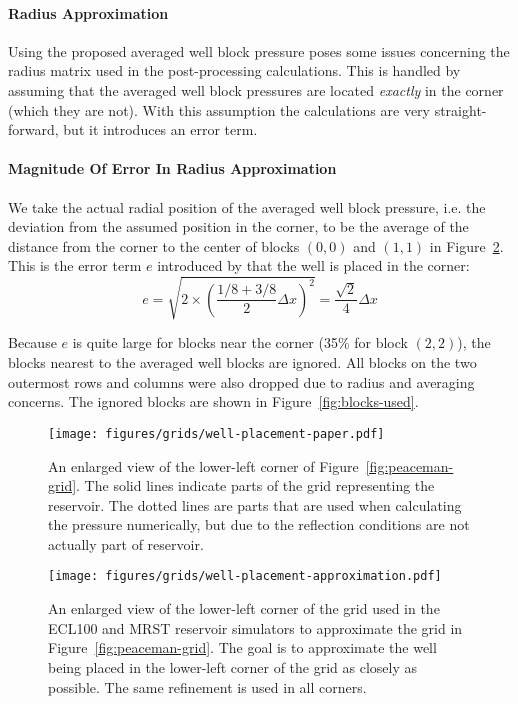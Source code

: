 \paragraph{Radius Approximation} %
\label{par:radius_approximation}
Using the proposed averaged well block pressure poses some issues concerning the radius matrix used in the post-processing calculations. This is handled by assuming that the averaged well block pressures are located \emph{exactly} in the corner (which they are not). With this assumption the calculations are very straight-forward, but it introduces an error term. 

\paragraph{Magnitude Of Error In Radius Approximation} %
\label{par:error_in_radius_approximation}
We take the actual radial position of the averaged well block pressure, i.e. the deviation from the assumed position in the corner, to be the average of the distance from the corner to the center of blocks $(0,0)$ and $(1,1)$ in Figure~\ref{fig:well-placement-approximation}. This is the error term $e$ introduced by that the well is placed in the corner:
\begin{equation}
    e = \sqrt{2\times \left( \frac{1/8+3/8}{2}\Delta x \right)^2} = \frac{\sqrt{2}}{4}\Delta x
\end{equation}

Because $e$ is quite large for blocks near the corner (35\% for block $(2,2)$), the  blocks nearest to the averaged well blocks are ignored. All blocks on the two outermost rows and columns were also dropped due to radius and averaging concerns. The ignored blocks are shown in Figure~\ref{fig:blocks-used}.

\begin{figure}[htbp]
    \centering
    \texttt{[image: figures/grids/well-placement-paper.pdf]}
    \caption{An enlarged view of the lower-left corner of Figure~\ref{fig:peaceman-grid}. The solid lines indicate parts of the grid representing the reservoir. The dotted lines are parts that are used when calculating the pressure numerically, but due to the reflection conditions are not actually part of reservoir.}
    \label{fig:well-placement-paper}
\end{figure}

\begin{figure}[htbp]
    \centering
    \texttt{[image: figures/grids/well-placement-approximation.pdf]}
    \caption{An enlarged view of the lower-left corner of the grid used in the ECL100 and MRST reservoir simulators to approximate the grid in Figure~\ref{fig:peaceman-grid}. The goal is to approximate the well being placed in the lower-left corner of the grid as closely as possible. The same refinement is used in all corners.}
    \label{fig:well-placement-approximation}
\end{figure}

